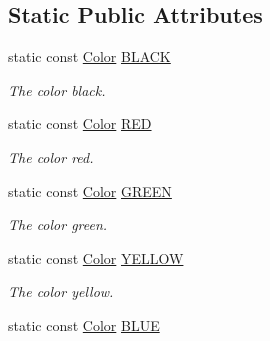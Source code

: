 \subsection*{Static Public Attributes}
\begin{DoxyCompactItemize}
\item 
\hypertarget{class_t_c_o_m_1_1_color_a597af2ae9a5d469660ca4524970c15c4}{static const \hyperlink{class_t_c_o_m_1_1_color}{Color} \hyperlink{class_t_c_o_m_1_1_color_a597af2ae9a5d469660ca4524970c15c4}{B\-L\-A\-C\-K}}\label{class_t_c_o_m_1_1_color_a597af2ae9a5d469660ca4524970c15c4}

\begin{DoxyCompactList}\small\item\em The color black. \end{DoxyCompactList}\item 
\hypertarget{class_t_c_o_m_1_1_color_aae63fc23cf0d0772e8b07c776f73b019}{static const \hyperlink{class_t_c_o_m_1_1_color}{Color} \hyperlink{class_t_c_o_m_1_1_color_aae63fc23cf0d0772e8b07c776f73b019}{R\-E\-D}}\label{class_t_c_o_m_1_1_color_aae63fc23cf0d0772e8b07c776f73b019}

\begin{DoxyCompactList}\small\item\em The color red. \end{DoxyCompactList}\item 
\hypertarget{class_t_c_o_m_1_1_color_a1995c0ef6be986e023c4a79392d6d6d9}{static const \hyperlink{class_t_c_o_m_1_1_color}{Color} \hyperlink{class_t_c_o_m_1_1_color_a1995c0ef6be986e023c4a79392d6d6d9}{G\-R\-E\-E\-N}}\label{class_t_c_o_m_1_1_color_a1995c0ef6be986e023c4a79392d6d6d9}

\begin{DoxyCompactList}\small\item\em The color green. \end{DoxyCompactList}\item 
\hypertarget{class_t_c_o_m_1_1_color_a7be81f3cdaa03037bb46504083ea8937}{static const \hyperlink{class_t_c_o_m_1_1_color}{Color} \hyperlink{class_t_c_o_m_1_1_color_a7be81f3cdaa03037bb46504083ea8937}{Y\-E\-L\-L\-O\-W}}\label{class_t_c_o_m_1_1_color_a7be81f3cdaa03037bb46504083ea8937}

\begin{DoxyCompactList}\small\item\em The color yellow. \end{DoxyCompactList}\item 
\hypertarget{class_t_c_o_m_1_1_color_a76c4d495cab47dea6fa6c240d5652b46}{static const \hyperlink{class_t_c_o_m_1_1_color}{Color} \hyperlink{class_t_c_o_m_1_1_color_a76c4d495cab47dea6fa6c240d5652b46}{B\-L\-U\-E}}\label{class_t_c_o_m_1_1_color_a76c4d495cab47dea6fa6c240d5652b46}


\end{DoxyCompactItemize}
